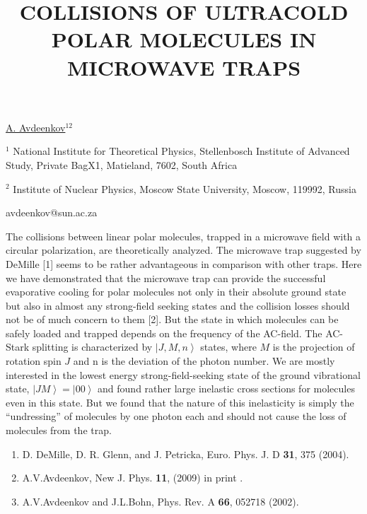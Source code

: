 \title{COLLISIONS OF ULTRACOLD POLAR MOLECULES IN \mbox{MICROWAVE} TRAPS}

\underline{A. Avdeenkov}$^{12}$ 

{\normalsize{\vspace{-4mm} $^1$ National Institute for Theoretical Physics, Stellenbosch
Institute of Advanced Study, Private BagX1, Matieland, 7602, South
Africa

\vspace{-4mm} $^2$ Institute of Nuclear Physics, Moscow State
University, Moscow, 119992, Russia

\email avdeenkov@sun.ac.za}}

The collisions between linear polar molecules, trapped in a
microwave field with a circular polarization, are theoretically
analyzed. The microwave trap suggested by DeMille [1] seems to be
rather advantageous in comparison with other traps. Here we have
demonstrated that the microwave trap can provide the successful
evaporative cooling for polar molecules not only in their absolute
ground state but also in almost any strong-field seeking states and
the collision losses should not be of much concern to them [2]. But
the state in which molecules can be safely loaded and trapped
depends on the frequency of the AC-field. The AC-Stark splitting is
characterized by $\left|J,M,n\right>$ states, where $M$ is the
projection of rotation spin $J$ and n is the deviation of the photon
number. We are mostly interested in the lowest energy
strong-field-seeking state of the ground vibrational state,
$\left|JM\right>= \left|00\right>$ and found rather large inelastic
cross sections for molecules even in this state. But we found that
the nature of this inelasticity is simply the ``undressing'' of
molecules by one photon each and should not cause the loss of
molecules from the trap.

\vspace{-4mm} {\normalsize
\begin{enumerate}
\item D. DeMille, D. R. Glenn, and J. Petricka, %
Euro. Phys. J. D \textbf{31}, 375 (2004).  %
\item A.V.Avdeenkov, %
New J. Phys. \textbf{11}, (2009) in print . %
\item A.V.Avdeenkov and J.L.Bohn, %
Phys. Rev. A \textbf{66}, 052718 (2002). %
\end{enumerate}
}

\vspace{\baselineskip}